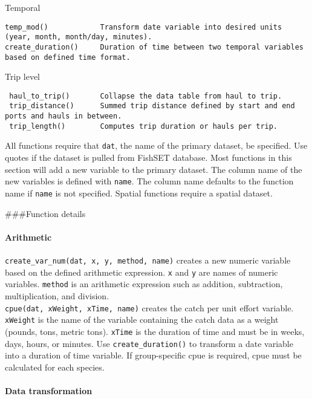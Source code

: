 \documentclass[
]{article}
\begin{document}
Temporal

\begin{verbatim}
temp_mod()            Transform date variable into desired units (year, month, month/day, minutes).
create_duration()     Duration of time between two temporal variables based on defined time format.
\end{verbatim}

Trip level

\begin{verbatim}
 haul_to_trip()       Collapse the data table from haul to trip.
 trip_distance()      Summed trip distance defined by start and end ports and hauls in between.
 trip_length()        Computes trip duration or hauls per trip. 
\end{verbatim}

All functions require that \texttt{dat}, the name of the primary dataset, be specified. Use quotes if the dataset is pulled from FishSET database. Most functions in this section will add a new variable to the primary dataset. The column name of the new variables is defined with \texttt{name}. The column name defaults to the function name if \texttt{name} is not specified. Spatial functions require a spatial dataset.

\#\#\#Function details

\hypertarget{arithmetic}{%
\paragraph{Arithmetic}\label{arithmetic}}

\texttt{create\_var\_num(dat,\ x,\ y,\ method,\ name)} creates a new numeric variable based on the defined arithmetic expression. \texttt{x} and \texttt{y} are names of numeric variables. \texttt{method} is an arithmetic expression such as addition, subtraction, multiplication, and division.\\
\texttt{cpue(dat,\ xWeight,\ xTime,\ name)} creates the catch per unit effort variable. \texttt{xWeight} is the name of the variable containing the catch data as a weight (pounds, tons, metric tons). \texttt{xTime} is the duration of time and must be in weeks, days, hours, or minutes. Use \texttt{create\_duration()} to transform a date variable into a duration of time variable.
If group-specific cpue is required, cpue must be calculated for each species.

\hypertarget{data-transformation}{%
\paragraph{Data transformation}\label{data-transformation}}
\end{document}

